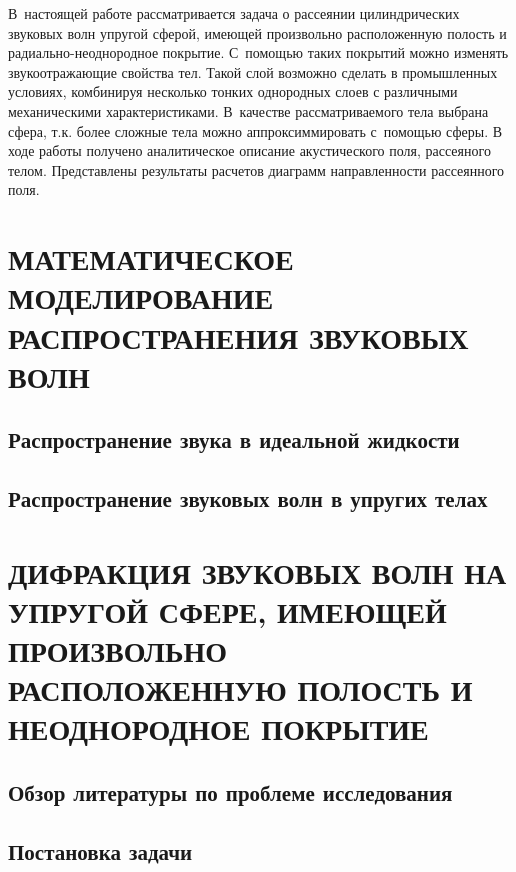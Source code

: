 В~настоящей работе рассматривается задача о рассеянии цилиндрических звуковых волн упругой сферой, имеющей произвольно расположенную полость и радиально-неоднородное покрытие. С~помощью таких покрытий можно изменять звукоотражающие свойства тел. Такой слой возможно сделать в промышленных условиях, комбинируя несколько тонких однородных слоев с различными механическими характеристиками. В~качестве рассматриваемого тела выбрана сфера, т.к. более сложные тела можно аппроксиммировать с~помощью сферы. В ходе работы получено аналитическое описание акустического поля, рассеяного телом. Представлены результаты расчетов диаграмм направленности рассеянного поля.

\newpage
\section{МАТЕМАТИЧЕСКОЕ МОДЕЛИРОВАНИЕ РАСПРОСТРАНЕНИЯ ЗВУКОВЫХ ВОЛН}

\newpage
\subsection{Распространение звука в идеальной жидкости}


\newpage
\subsection{Распространение звуковых волн в упругих телах}


\newpage
\section{ДИФРАКЦИЯ ЗВУКОВЫХ ВОЛН НА УПРУГОЙ СФЕРЕ, ИМЕЮЩЕЙ ПРОИЗВОЛЬНО РАСПОЛОЖЕННУЮ ПОЛОСТЬ И НЕОДНОРОДНОЕ ПОКРЫТИЕ}

\newpage
\subsection{Обзор литературы по проблеме исследования}

\newpage
\subsection{Постановка задачи}


